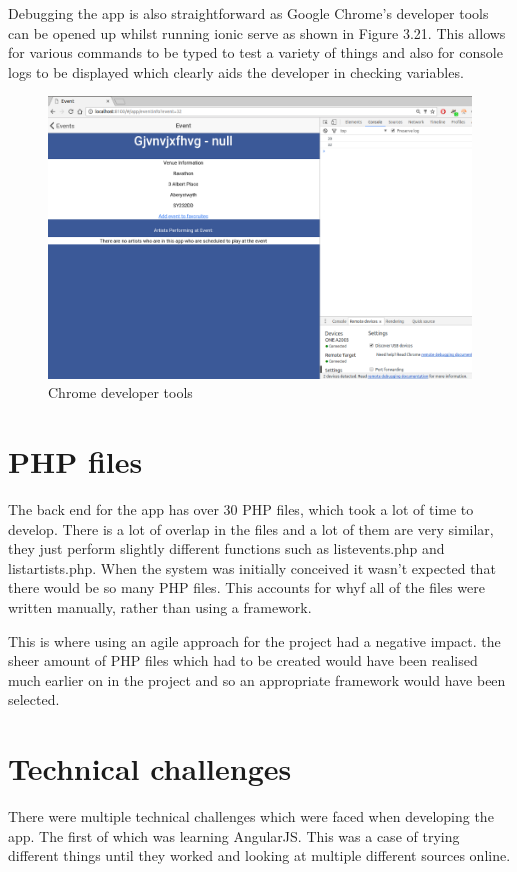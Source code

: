 Debugging the app is also straightforward as Google Chrome's developer tools can be opened up whilst running ionic serve as shown in Figure 3.21. This allows for various commands to be typed to test a variety of things and also for console logs to be displayed which clearly aids the developer in checking variables.
\begin{center}
\begin{figure}[H]
\includegraphics[scale=0.45]{images/chrome2}
\caption{Chrome developer tools}
\end{figure}
\end{center}

\section{PHP files}
The back end for the app has over 30 PHP files, which took a lot of time to develop. There is a lot of overlap in the files and a lot of them are very similar, they just perform slightly different functions such as listevents.php and listartists.php. When the system was initially conceived  it wasn't expected that there would be so many PHP files. This accounts for whyf all of the files were written manually, rather than using a framework. 

This is where using an agile approach for the project had a negative impact. the sheer amount of PHP files which had to be created would have been realised much earlier on in the project and so an appropriate framework would have been selected.

\section{Technical challenges}
There were multiple technical challenges which were faced when developing the app. The first of which was learning AngularJS. This was a case of trying different things until they worked and looking at multiple different sources online.

